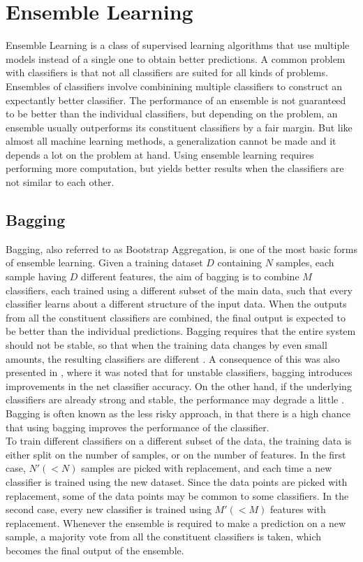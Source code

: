 \chapter{Ensemble Learning}
\label{chapter:Ensemble Learning}

Ensemble Learning is a class of supervised learning algorithms that use multiple models instead of a single one to obtain better predictions. A common problem with classifiers is that not all classifiers are suited for all kinds of problems. Ensembles of classifiers involve combinining multiple classifiers to construct an expectantly better classifier. The performance of an ensemble is not guaranteed to be better than the individual classifiers, but depending on the problem, an ensemble usually outperforms its constituent classifiers by a fair margin. But like almost all machine learning methods, a generalization cannot be made and it depends a lot on the problem at hand. Using ensemble learning requires performing more computation, but yields better results when the classifiers are not similar to each other.

\section{Bagging}
Bagging, also referred to as Bootstrap Aggregation, is one of the most basic forms of ensemble learning. Given a training dataset $D$ containing $N$ samples, each sample having $D$ different features, the aim of bagging is to combine $M$ classifiers, each trained using a different subset of the main data, such that every classifier learns about a different structure of the input data. When the outputs from all the constituent classifiers are combined, the final output is expected to be better than the individual predictions. Bagging requires that the entire system should not be stable, so that when the training data changes by even small amounts, the resulting classifiers are different \cite{quinlan1996bagging}. A consequence of this was also presented in \cite{breiman1996bagging}, where it was noted that for unstable classifiers, bagging introduces improvements in the net classifier accuracy. On the other hand, if the underlying classifiers are already strong and stable, the performance may degrade a little \cite{breiman1996bagging}. Bagging is often known as the less risky approach, in that there is a high chance that using bagging improves the performance of the classifier.\\

To train different classifiers on a different subset of the data, the training data is either split on the number of samples, or on the number of features. In the first case, $N' (< N)$ samples are picked with replacement, and each time a new classifier is trained using the new dataset. Since the data points are picked with replacement, some of the data points may be common to some classifiers. In the second case, every new classifier is trained using $M' (< M)$ features with replacement. Whenever the ensemble is required to make a prediction on a new sample, a majority vote from all the constituent classifiers is taken, which becomes the final output of the ensemble.

